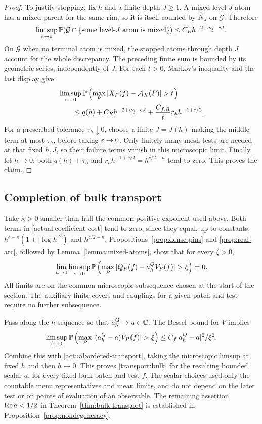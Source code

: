 \begin{proof}
To justify stopping, fix $h$ and a finite depth $J\ge1$. A mixed
level-$J$ atom has a mixed parent for the same rim, so it is itself
counted by $\widehat N_J$ on $\mathcal G$. Therefore
\[
 \limsup_{\varepsilon\to0}
 \mathbb P(\mathcal G\cap\{\text{some level-}J\text{ atom is mixed}\})
                  \le C_Rh^{-2+c}2^{-cJ}.
\]
On $\mathcal G$ when no terminal atom is mixed, the stopped atoms
through depth $J$ account for the whole discrepancy. The preceding
finite sum is bounded by its geometric series, independently of $J$.
For each $t>0$, Markov's inequality and the last display give
\[
 \begin{aligned}
 &\limsup_{\eps\to0}
   \PP\left(\max_P|X_P(f)-\mathcal A_X(P)|>t\right)\\
 &\qquad\le q(h)+C_Rh^{-2+c}2^{-cJ}
                +\frac{C_{f,R}}{t}r_hh^{-1+c/2}.
 \end{aligned}
\]
For a prescribed tolerance $\tau_h\downarrow0$, choose a finite
$J=J(h)$ making the middle term at most $\tau_h$, before taking
$\varepsilon\to0$. Only finitely many mesh tests are needed at that fixed
$h,J$, so their failure terms vanish in this microscopic limit.
Finally let $h\to0$: both $q(h)+\tau_h$ and
$r_hh^{-1+c/2}=h^{c/2-\kappa}$ tend to zero. This proves the claim.
\end{proof}

\subsection{Completion of bulk transport}

Take $\kappa>0$ smaller than half the common positive exponent used
above.  Both terms in \eqref{actual:coefficient-cost} tend to zero,
since they equal, up to constants,
$h^{c-\kappa}(1+|\log h|^2)$ and $h^{c/2-\kappa}$.
Propositions~\ref{prop:dense-pins} and \ref{prop:real-arc}, followed
by Lemma~\ref{lemma:mixed-atoms}, show that for every $\xi>0$,
\begin{equation}\label{actual:ordered-transport}
 \lim_{h\to0}\limsup_{\eps\to0}
 \PP\left(\max_P|Q_P(f)-a_h^QV_P(f)|>\xi\right)=0.
\end{equation}
All limits are on the common microscopic subsequence chosen at the
start of the section.  The auxiliary finite covers and couplings
for a given patch and test require no further subsequence.

Pass along the $h$ sequence so that $a_h^Q\to a\in\mathbb C$.
The Bessel bound for $V$ implies
\[
 \limsup_{\eps\to0}
 \PP\left(\max_P|(a_h^Q-a)V_P(f)|>\xi\right)
                         \le C_f|a_h^Q-a|^2/\xi^2.
\]
Combine this with \eqref{actual:ordered-transport}, taking the
microscopic limsup at fixed $h$ and then $h\to0$.  This proves
\eqref{transport:bulk} for the resulting bounded scalar $a$, for
every fixed bulk patch and test $f$.  The scalar choices used only
the countable menu representatives and mean limits, and do not
depend on the later test or on points of evaluation of an observable.
The remaining assertion $\operatorname{Re} a<1/2$ in
Theorem~\ref{thm:bulk-transport} is established in
Proposition~\ref{prop:nondegeneracy}.
